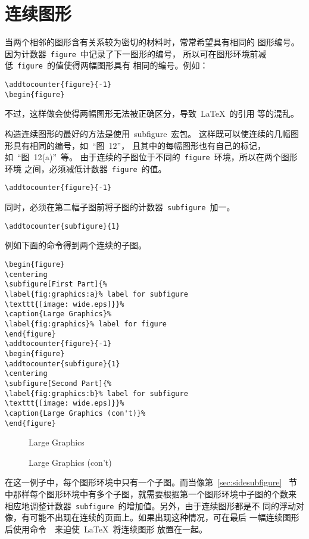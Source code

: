 
\section{连续图形}

当两个相邻的图形含有关系较为密切的材料时，常常希望具有相同的
图形编号。因为计数器~\texttt{figure}~中记录了下一图形的编号，
所以可在图形环境前减低~\texttt{figure}~的值使得两幅图形具有
相同的编号。例如：
\begin{Verbatim}[xleftmargin=1cm]
\addtocounter{figure}{-1} 
\begin{figure}
\end{Verbatim}
不过，这样做会使得两幅图形无法被正确区分，导致~\LaTeX{}~的引用
等的混乱。

构造连续图形的最好的方法是使用~\textsf{subfigure}~宏包。
这样既可以使连续的几幅图形具有相同的编号，如~``{图}~12''，
且其中的每幅图形也有自己的标记，如~``{图}~12(a)''~等。
由于连续的子图位于不同的~\texttt{figure}~环境，所以在两个图形环境
之间，必须减低计数器~\texttt{figure}~的值。
\begin{Verbatim}[xleftmargin=1cm]
\addtocounter{figure}{-1} 
\end{Verbatim}
同时，必须在第二幅子图前将子图的计数器~\texttt{subfigure}~加一。
\begin{Verbatim}[xleftmargin=1cm]
\addtocounter{subfigure}{1}
\end{Verbatim}
例如下面的命令得到两个连续的子图。
\begin{Verbatim}[xleftmargin=1cm]
\begin{figure} 
\centering 
\subfigure[First Part]{% 
\label{fig:graphics:a}% label for subfigure 
\texttt{[image: wide.eps]}}% 
\caption{Large Graphics}% 
\label{fig:graphics}% label for figure
\end{figure} 
\addtocounter{figure}{-1} 
\begin{figure} 
\addtocounter{subfigure}{1} 
\centering 
\subfigure[Second Part]{% 
\label{fig:graphics:b}% label for subfigure 
\texttt{[image: wide.eps]}}% 
\caption{Large Graphics (con't)}% 
\end{figure}
\end{Verbatim}

\begin{figure} 
	\centering 
	\caption{Large Graphics}%
	\label{fig:graphics}%
\end{figure} 
\addtocounter{figure}{-1} 
\begin{figure} 
	\addtocounter{subfigure}{1} 
	\centering 
	\caption{Large Graphics (con't)}%
\end{figure}

在这一例子中，每个图形环境中只有一个子图。而当像第~\ref{sec:sidesubfigure}~
节中那样每个图形环境中有多个子图，就需要根据第一个图形环境中子图的个数来
相应地调整计数器~\texttt{subfigure}~的增加值。另外，由于连续图形都是不
同的浮动对像，有可能不出现在连续的页面上。如果出现这种情况，可在最后
一幅连续图形后使用命令~~来迫使~\LaTeX{}~将连续图形
放置在一起。

\endinput